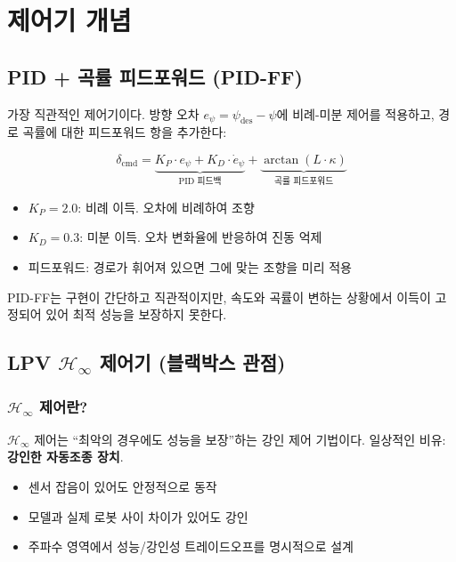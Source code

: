 \section{제어기 개념}
\label{sec:controller}

\subsection{PID + 곡률 피드포워드 (PID-FF)}

가장 직관적인 제어기이다.
방향 오차 $e_\psi = \psi_\text{des} - \psi$에 비례-미분 제어를 적용하고,
경로 곡률에 대한 피드포워드 항을 추가한다:

\begin{equation}
    \delta_\text{cmd} = \underbrace{K_P \cdot e_\psi + K_D \cdot \dot{e}_\psi}_{\text{PID 피드백}}
    + \underbrace{\arctan(L \cdot \kappa)}_{\text{곡률 피드포워드}}
    \label{eq:pid}
\end{equation}

\begin{itemize}[nosep]
    \item $K_P = 2.0$: 비례 이득. 오차에 비례하여 조향
    \item $K_D = 0.3$: 미분 이득. 오차 변화율에 반응하여 진동 억제
    \item 피드포워드: 경로가 휘어져 있으면 그에 맞는 조향을 미리 적용
\end{itemize}

PID-FF는 구현이 간단하고 직관적이지만, 속도와 곡률이 변하는 상황에서
이득이 고정되어 있어 최적 성능을 보장하지 못한다.

\subsection{LPV $\mathcal{H}_\infty$ 제어기 (블랙박스 관점)}

\subsubsection{$\mathcal{H}_\infty$ 제어란?}

$\mathcal{H}_\infty$ 제어는 ``최악의 경우에도 성능을 보장''하는 강인 제어 기법이다.
일상적인 비유: \textbf{강인한 자동조종 장치}.

\begin{itemize}[nosep]
    \item 센서 잡음이 있어도 안정적으로 동작
    \item 모델과 실제 로봇 사이 차이가 있어도 강인
    \item 주파수 영역에서 성능/강인성 트레이드오프를 명시적으로 설계
\end{itemize}

